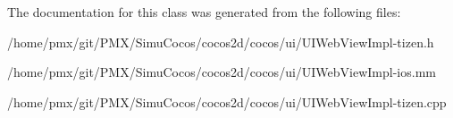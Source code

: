 The documentation for this class was generated from the following files\+:\begin{DoxyCompactItemize}
\item 
/home/pmx/git/\+P\+M\+X/\+Simu\+Cocos/cocos2d/cocos/ui/U\+I\+Web\+View\+Impl-\/tizen.\+h\item 
/home/pmx/git/\+P\+M\+X/\+Simu\+Cocos/cocos2d/cocos/ui/U\+I\+Web\+View\+Impl-\/ios.\+mm\item 
/home/pmx/git/\+P\+M\+X/\+Simu\+Cocos/cocos2d/cocos/ui/U\+I\+Web\+View\+Impl-\/tizen.\+cpp\end{DoxyCompactItemize}
